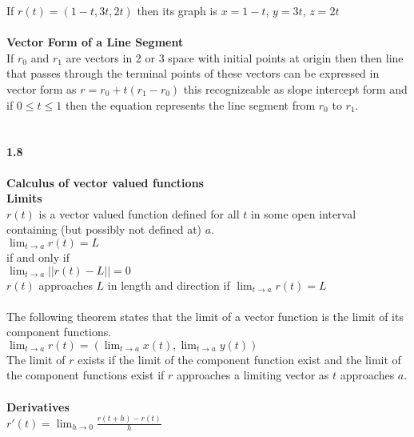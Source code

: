\documentclass[14pt]{extreport}
\begin{document}
If $r(t) = (1-t, 3t, 2t)$ then its graph is $x=1-t$, $y=3t$, $z=2t$\\\\

\textbf{Vector Form of a Line Segment}\\

If $r_0$ and $r_1$ are vectors in 2 or 3 space with initial points at origin then then line that passes through the terminal points of these vectors can be expressed in vector form as $r=r_0 + t(r_1 - r_0)$ this recognizeable as slope intercept form and if $0 \le t \le 1$ then the equation represents the line segment from $r_0$ to $r_1$.\\\\

\paragraph{1.8}\textbf{Calculus of vector valued functions}\\

\textbf{Limits}\\
$r(t)$ is a vector valued function defined for all $t$ in some open interval containing (but possibly not defined at) $a$.\\

$\lim_{t \to a} r(t)=L$\\
if and only if\\
$\lim_{t \to a} ||r(t) - L|| = 0$\\

$r(t)$ approaches $L$ in length and direction if $\lim_{t \to a} r(t) = L$\\\\

The following theorem states that the limit of a vector function is the limit of its component functions.\\

$\lim_{t \to a} r(t) = (\lim_{t \to a} x(t), \lim_{t \to a} y(t))$\\

The limit of $r$ exists if the limit of the component function exist and the limit of the component functions exist if $r$ approaches a limiting vector as $t$ approaches $a$.\\\\

\textbf{Derivatives}\\

$r'(t) = \lim_{h \to 0} \frac{r(t+h) - r(t)}{h}$\\
\end{document}
